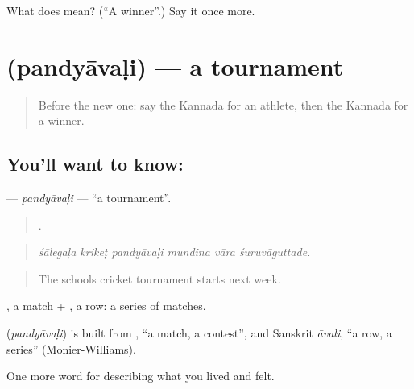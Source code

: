 \begin{tcolorbox}[breakable,colback=teal!4,colframe=teal!35!black,title={Before you move on}]
What does  mean? (\textquotedblleft{}A winner\textquotedblright{}.) Say it once more.
\end{tcolorbox}
\section[\texorpdfstring{\kn{ಪಂದ್ಯಾವಳಿ} (pandyāvaḷi)}{ಪಂದ್ಯಾವಳಿ (pandyāvaḷi)}]{ (pandyāvaḷi) — a tournament}

\label{lesson:KA-C538-pandyavali}



\begin{quote}
Before the new one: say the Kannada for an athlete, then the Kannada for a winner.
\end{quote}

\subsection*{You'll want to know: }
\textbf{} — \emph{pandyāvaḷi} — \textquotedblleft{}a tournament\textquotedblright{}.

\begin{quote}
     .
\end{quote}

\begin{quote}
\emph{śālegaḷa krikeṭ pandyāvaḷi mundina vāra śuruvāguttade.}
\end{quote}

\begin{quote}
The schools cricket tournament starts next week.
\end{quote}

, a match + , a row: a series of matches.

\begin{cousinweb}
\textbf{} (\emph{pandyāvaḷi}) is built from , \textquotedblleft{}a match, a contest\textquotedblright{}, and Sanskrit \emph{āvali}, \textquotedblleft{}a row, a series\textquotedblright{} (Monier-Williams).
\end{cousinweb}

\begin{grammarlens}[title={What you've built}]
One more word for describing what you lived and felt.
\end{grammarlens}


